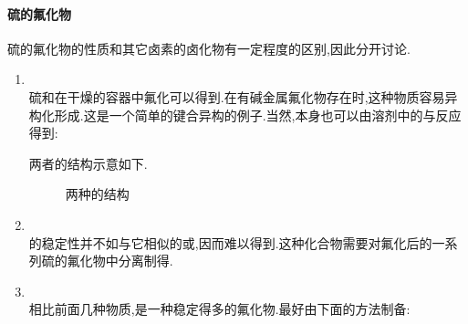 \documentclass{ctexart}
\begin{document}
\paragraph{硫的氟化物} 硫的氟化物的性质和其它卤素的卤化物有一定程度的区别,因此分开讨论.
\begin{enumerate}[label=\tbf{\arabic*},topsep=0pt,parsep=0pt,itemsep=0pt,partopsep=0pt]
    \item {}\\
        硫和在干燥的容器中氟化可以得到.在有碱金属氟化物存在时,这种物质容易异构化形成.这是一个简单的键合异构的例子.当然,本身也可以由溶剂中的与反应得到:
        \begin{center}
        \end{center}
        两者的结构示意如下.
        \begin{figure}[H]
            \centering
            \caption{两种的结构}
        \end{figure}
    \item {}\\
        \indent {}的稳定性并不如与它相似的或,因而难以得到.这种化合物需要对氟化后的一系列硫的氟化物中分离制得.
    \item {}\\
        \indent 相比前面几种物质,是一种稳定得多的氟化物.最好由下面的方法制备:

\end{enumerate}
\end{document}
